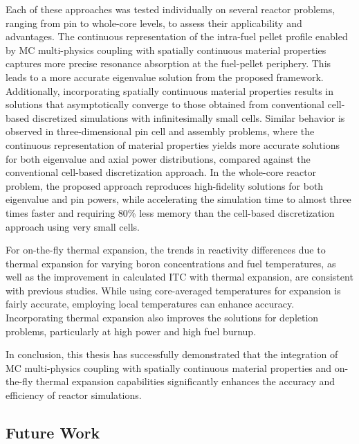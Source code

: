 Each of these approaches was tested individually on several reactor problems, ranging from pin to whole-core levels, to assess their applicability and advantages. The continuous representation of the intra-fuel pellet profile enabled by MC multi-physics coupling with spatially continuous material properties captures more precise resonance absorption at the fuel-pellet periphery. This leads to a more accurate eigenvalue solution from the proposed framework. Additionally, incorporating spatially continuous material properties results in solutions that asymptotically converge to those obtained from conventional cell-based discretized simulations with infinitesimally small cells. Similar behavior is observed in three-dimensional pin cell and assembly problems, where the continuous representation of material properties yields more accurate solutions for both eigenvalue and axial power distributions, compared against the conventional cell-based discretization approach. In the whole-core reactor problem, the proposed approach reproduces high-fidelity solutions for both eigenvalue and pin powers, while accelerating the simulation time to almost three times faster and requiring 80\% less memory than the cell-based discretization approach using very small cells.

For on-the-fly thermal expansion, the trends in reactivity differences due to thermal expansion for varying boron concentrations and fuel temperatures, as well as the improvement in calculated ITC with thermal expansion, are consistent with previous studies. While using core-averaged temperatures for expansion is fairly accurate, employing local temperatures can enhance accuracy. Incorporating thermal expansion also improves the solutions for depletion problems, particularly at high power and high fuel burnup.

In conclusion, this thesis has successfully demonstrated that the integration of MC multi-physics coupling with spatially continuous material properties and on-the-fly thermal expansion capabilities significantly enhances the accuracy and efficiency of reactor simulations.

\subsection{Future Work}

